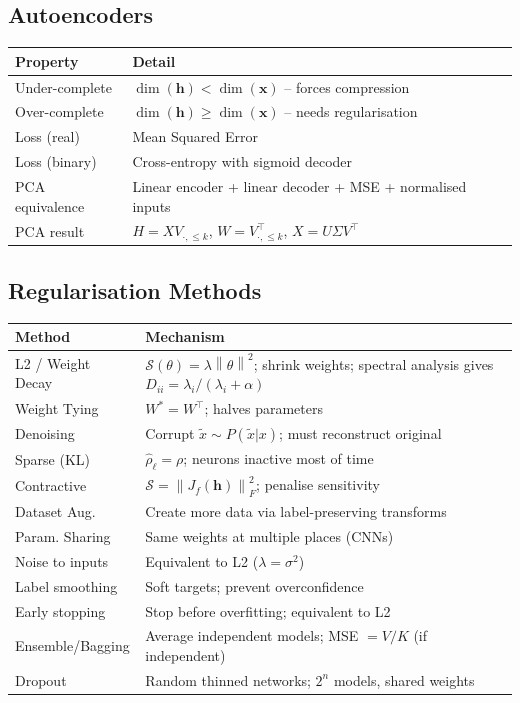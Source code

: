 \documentclass[12pt,a4paper]{article}
\newcommand{\norm}[1]{\left\|#1\right\|}
\newcommand{\vx}{\mathbf{x}}
\newcommand{\vh}{\mathbf{h}}
\newcommand{\Reg}{\mathcal{S}}
\begin{document}
\subsection{Autoencoders}

\begin{center}
\begin{tabular}{ll}
\toprule
\textbf{Property} & \textbf{Detail} \\
\midrule
Under-complete & $\dim(\vh) < \dim(\vx)$ -- forces compression \\
Over-complete & $\dim(\vh) \geq \dim(\vx)$ -- needs regularisation \\
Loss (real) & Mean Squared Error \\
Loss (binary) & Cross-entropy with sigmoid decoder \\
PCA equivalence & Linear encoder + linear decoder + MSE + normalised inputs \\
PCA result & $H = XV_{\cdot,\leq k}$, $W = V_{\cdot,\leq k}^\top$, $X = U\Sigma V^\top$ \\
\bottomrule
\end{tabular}
\end{center}

\subsection{Regularisation Methods}

\begin{center}
\begin{tabular}{lp{8cm}}
\toprule
\textbf{Method} & \textbf{Mechanism} \\
\midrule
L2 / Weight Decay & $\Reg(\theta) = \lambda\norm{\theta}^2$; shrink weights; spectral analysis gives $D_{ii} = \lambda_i/(\lambda_i+\alpha)$ \\
Weight Tying & $W^* = W^\top$; halves parameters \\
Denoising & Corrupt $\tilde{x}\sim P(\tilde{x}|x)$; must reconstruct original \\
Sparse (KL) & $\hat{\rho}_\ell = \rho$; neurons inactive most of time \\
Contractive & $\Reg = \norm{J_f(\vh)}_F^2$; penalise sensitivity \\
Dataset Aug. & Create more data via label-preserving transforms \\
Param. Sharing & Same weights at multiple places (CNNs) \\
Noise to inputs & Equivalent to L2 ($\lambda = \sigma^2$) \\
Label smoothing & Soft targets; prevent overconfidence \\
Early stopping & Stop before overfitting; equivalent to L2 \\
Ensemble/Bagging & Average independent models; MSE $= V/K$ (if independent) \\
Dropout & Random thinned networks; $2^n$ models, shared weights \\
\bottomrule
\end{tabular}
\end{center}
\end{document}
